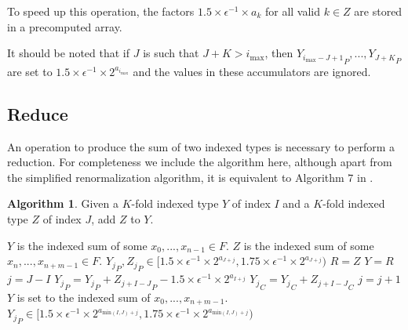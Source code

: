\documentclass[12pt]{article}
\providecommand{\min}{\ensuremath{\text{min}}}
\providecommand{\max}{\ensuremath{\text{max}}}
\theoremstyle{definition}
\newtheorem{alg}{Algorithm}[section]
\numberwithin{equation}{section}
\numberwithin{figure}{section}
\begin{document}
    To speed up this operation, the factors $1.5 \times \epsilon^{-1} \times a_k$ for all valid $k \in Z$ are stored in a precomputed array.

    It should be noted that if $J$ is such that $J + K > i_{\max}$, then ${Y_{i_{\max} - J + 1}}_P, ...,  {Y_{J + K}}_P$ are set to $1.5\times \epsilon^{-1}\times2^{a_{i_{\max}}}$ and the values in these accumulators are ignored.

  \subsection{Reduce}
    \label{sec:primitiveops_reduce}
    An operation to produce the sum of two indexed types is necessary to perform a reduction. For completeness we include the algorithm here, although apart from the simplified renormalization algorithm, it is equivalent to Algorithm $7$ in \cite{repsum}.

    \begin{samepage}
    \begin{alg}
      Given a $K$-fold indexed type $Y$ of index $I$ and a $K$-fold indexed type $Z$ of index $J$, add $Z$ to $Y$.
      \begin{algorithmic}[1]
        \Ensure
          \Statex $Y$ is the indexed sum of some $x_0, ..., x_{n - 1} \in F$.
          \Statex $Z$ is the indexed sum of some $x_n, ..., x_{n + m - 1} \in F$.
          \Statex ${Y_j}_P, {Z_j}_P \in [1.5 \times \epsilon^{-1}\times 2^{a_{J + j}}, 1.75 \times \epsilon^{-1}\times 2^{a_{J + j}})$
          \State {}
          \State {}
            \State $R = Z$
            \State {}
            \State $Y = R$
          \EndIf
          \State $j = J - I$
            \State ${Y_{j}}_P = {Y_{j}}_P + {Z_{j + I - J}}_P - 1.5 \times \epsilon^{-1} \times 2^{a_{I + j}}$
            \State ${Y_{j}}_C = {Y_{j}}_C + {Z_{j + I - J}}_C$
            \State $j = j + 1$
          \EndWhile
          \State {}
        \EndFunction
        \Ensure
          \Statex $Y$ is set to the indexed sum of $x_0, ..., x_{n + m - 1}$.
          \Statex ${Y_j}_P \in [1.5 \times \epsilon^{-1}\times 2^{a_{\min(I, J) + j}}, 1.75 \times \epsilon^{-1}\times 2^{a_{\min(I, J) + j}})$
      \end{algorithmic}
      \label{alg:reduce}
    \end{alg}
    \end{samepage}
\end{document}
